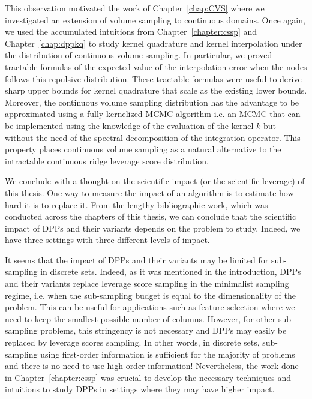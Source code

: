 \documentclass[twoside,11pt]{book}
\numberwithin{theorem}{chapter}
\numberwithin{definition}{chapter}
\numberwithin{proposition}{chapter}
\numberwithin{corollary}{chapter}
\numberwithin{example}{chapter}
\numberwithin{lemma}{chapter}
\numberwithin{assumption}{chapter}
\numberwithin{equation}{chapter}
\numberwithin{figure}{chapter}
\begin{document}
This observation motivated the work of Chapter~\ref{chap:CVS} where we investigated an extension of  volume sampling to continuous domains. Once again, we used the accumulated intuitions from Chapter~\ref{chapter:cssp} and Chapter~\ref{chap:dppkq} to study kernel quadrature and kernel interpolation under the distribution of continuous volume sampling. In particular, we proved tractable formulas of the expected value of the interpolation error when the nodes follows this repulsive distribution. These tractable formulas were useful to derive sharp upper bounds for kernel quadrature that scale as the existing lower bounds. Moreover, the continuous volume sampling distribution has the advantage to be approximated using a fully kernelized MCMC algorithm i.e. an MCMC that can be implemented using the knowledge of the evaluation of the kernel $k$ but without the need of the spectral decomposition of the integration operator. This property places continuous volume sampling as a natural alternative to the intractable continuous ridge leverage score distribution.

We conclude with a thought on the scientific impact (or the scientific leverage) of this thesis.
One way to measure the impact of an algorithm is to estimate how hard it is to replace it.
From the lengthy bibliographic work, which was conducted across the chapters of this thesis, we can conclude that the scientific impact of DPPs and their variants depends on the problem to study. Indeed, we have three settings with three different levels of impact. 

It seems that the impact of DPPs and their variants may be limited for sub-sampling in discrete sets. Indeed, as it was mentioned in the introduction, DPPs and their variants replace leverage score sampling in the minimalist sampling regime, i.e. when the sub-sampling budget is equal to the dimensionality of the problem. This can be useful for applications such as feature selection where we need to keep the smallest possible number of columns. However, for other sub-sampling problems, this stringency is not necessary and DPPs may easily be replaced by leverage scores sampling. In other words, in discrete sets, sub-sampling using first-order information is sufficient for the majority of problems and there is no need to use high-order information!
Nevertheless, the work done in Chapter~\ref{chapter:cssp} was crucial to develop the necessary techniques and intuitions to study DPPs in  settings where they may have higher impact.
\end{document}
